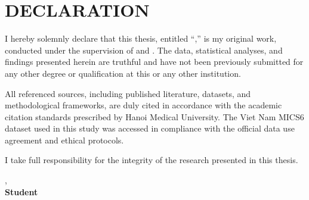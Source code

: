 \chapter*{DECLARATION}
{}

I hereby solemnly declare that this thesis, entitled ``\ThesisTitle,'' is my original work, conducted under the supervision of \SupervisorNameA{} and \SupervisorNameB. The data, statistical analyses, and findings presented herein are truthful and have not been previously submitted for any other degree or qualification at this or any other institution.

All referenced sources, including published literature, datasets, and methodological frameworks, are duly cited in accordance with the academic citation standards prescribed by Hanoi Medical University. The Viet Nam MICS6 dataset used in this study was accessed in compliance with the official data use agreement and ethical protocols.

I take full responsibility for the integrity of the research presented in this thesis.

\begin{flushright}
\SubmissionCity, \SubmissionYear\\
\textbf{Student}\\[1.8cm]
\textbf{\StudentName}
\end{flushright}

\clearpage

